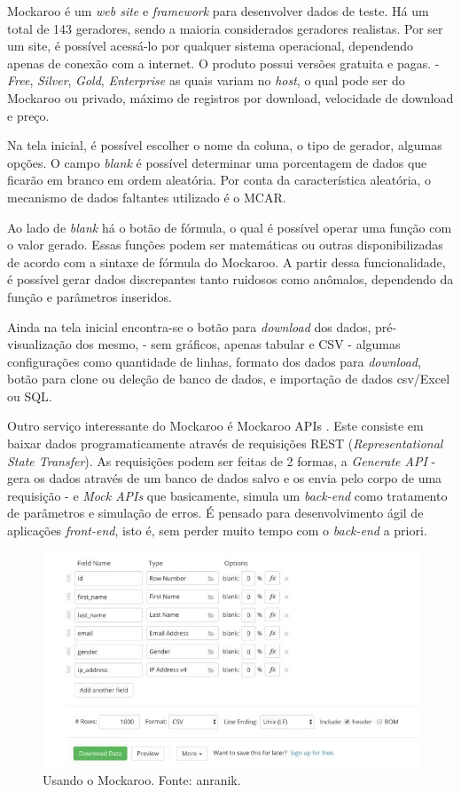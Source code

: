 \documentclass[
	12pt,				%
	openright,			%
	twoside,			%
	a4paper,			%
	english,			%
	brazil				%
	]{abntex2}
\begin{document}
		Mockaroo \cite{mockaroo} é um \emph{web site} e \emph{framework} para desenvolver dados de teste.
		Há um total de 143 geradores, sendo a maioria considerados geradores realistas.
		Por ser um site, é possível acessá-lo por qualquer sistema operacional, dependendo apenas de conexão com a internet.
		O produto possui versões gratuita e pagas. - \emph{Free}, \emph{Silver}, \emph{Gold}, \emph{Enterprise} as quais variam no \emph{host}, o qual pode ser do Mockaroo ou privado, máximo de registros por download, velocidade de download e preço.
		\par
		Na tela inicial, é possível escolher o nome da coluna, o tipo de gerador, algumas opções.
		O campo \emph{blank} é possível determinar uma porcentagem de dados que ficarão em branco em ordem aleatória.
		Por conta da característica aleatória, o mecanismo de dados faltantes utilizado é o MCAR.
		\par
		Ao lado de \emph{blank} há o botão de fórmula, o qual é possível operar uma função com o valor gerado.
		Essas funções podem ser matemáticas ou outras disponibilizadas de acordo com a sintaxe de fórmula do Mockaroo.
		A partir dessa funcionalidade, é possível gerar dados discrepantes tanto ruidosos como anômalos, dependendo da função e parâmetros inseridos.
		\par
		Ainda na tela inicial encontra-se 
		 o botão para \emph{download} dos dados, 
		 pré-visualização dos mesmo, - sem gráficos, apenas tabular e CSV - 
		 algumas configurações como quantidade de linhas, 
		 formato dos dados para \emph{download}, 
		 botão para clone ou deleção de banco de dados, 
		 e importação de dados csv/Excel ou SQL.
		\par
		Outro serviço interessante do Mockaroo é Mockaroo APIs \cite{mockarooAPI}.
		Este consiste em baixar dados programaticamente através de requisições REST (\emph{Representational State Transfer}).
		As requisições podem ser feitas de 2 formas, a \emph{Generate API} - gera os dados através de um banco de dados salvo e os envia pelo corpo de uma requisição - 
		e \emph{Mock APIs} que basicamente, simula um \emph{back-end} como tratamento de parâmetros e simulação de erros. 
		É pensado para desenvolvimento ágil de aplicações \emph{front-end}, isto é, sem perder muito tempo com o \emph{back-end} a priori.
		\begin{figure}[h]
			\centering
			\includegraphics[width=\linewidth]{./figures/TrabalhosRelacionados/mockaroo.jpg}
			\caption{Usando o Mockaroo. Fonte: anranik.}
			\label{fig:mockaroo}
		\end{figure}
\end{document}
